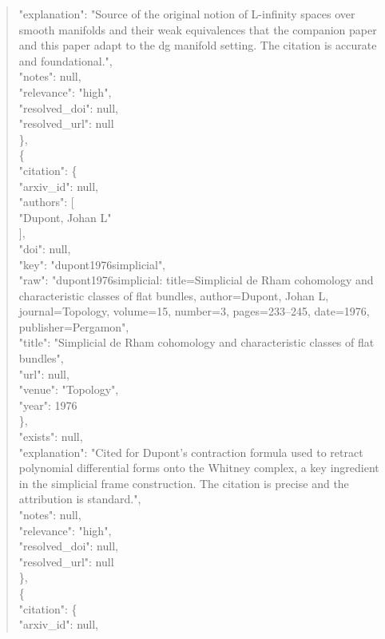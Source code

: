 \documentclass[11pt]{article}
\begin{document}
\begin{quote}
      "explanation": "Source of the original notion of L-infinity spaces over smooth manifolds and their weak equivalences that the companion paper and this paper adapt to the dg manifold setting. The citation is accurate and foundational.",\\
      "notes": null,\\
      "relevance": "high",\\
      "resolved\_doi": null,\\
      "resolved\_url": null\\
    \},\\
    \{\\
      "citation": \{\\
        "arxiv\_id": null,\\
        "authors": [\\
          "Dupont, Johan L"\\
        ],\\
        "doi": null,\\
        "key": "dupont1976simplicial",\\
        "raw": "dupont1976simplicial: title=Simplicial de Rham cohomology and characteristic classes of flat bundles, author=Dupont, Johan L, journal=Topology, volume=15, number=3, pages=233--245, date=1976, publisher=Pergamon",\\
        "title": "Simplicial de Rham cohomology and characteristic classes of flat bundles",\\
        "url": null,\\
        "venue": "Topology",\\
        "year": 1976\\
      \},\\
      "exists": null,\\
      "explanation": "Cited for Dupont's contraction formula used to retract polynomial differential forms onto the Whitney complex, a key ingredient in the simplicial frame construction. The citation is precise and the attribution is standard.",\\
      "notes": null,\\
      "relevance": "high",\\
      "resolved\_doi": null,\\
      "resolved\_url": null\\
    \},\\
    \{\\
      "citation": \{\\
        "arxiv\_id": null,\\

\end{quote}
\end{document}

